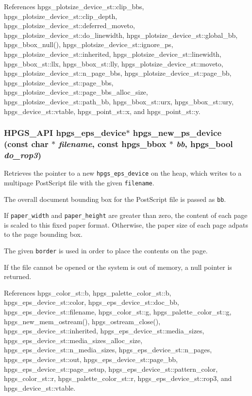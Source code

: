References hpgs\_\-plotsize\_\-device\_\-st::clip\_\-bbs, hpgs\_\-plotsize\_\-device\_\-st::clip\_\-depth, hpgs\_\-plotsize\_\-device\_\-st::deferred\_\-moveto, hpgs\_\-plotsize\_\-device\_\-st::do\_\-linewidth, hpgs\_\-plotsize\_\-device\_\-st::global\_\-bb, hpgs\_\-bbox\_\-null(), hpgs\_\-plotsize\_\-device\_\-st::ignore\_\-ps, hpgs\_\-plotsize\_\-device\_\-st::inherited, hpgs\_\-plotsize\_\-device\_\-st::linewidth, hpgs\_\-bbox\_\-st::llx, hpgs\_\-bbox\_\-st::lly, hpgs\_\-plotsize\_\-device\_\-st::moveto, hpgs\_\-plotsize\_\-device\_\-st::n\_\-page\_\-bbs, hpgs\_\-plotsize\_\-device\_\-st::page\_\-bb, hpgs\_\-plotsize\_\-device\_\-st::page\_\-bbs, hpgs\_\-plotsize\_\-device\_\-st::page\_\-bbs\_\-alloc\_\-size, hpgs\_\-plotsize\_\-device\_\-st::path\_\-bb, hpgs\_\-bbox\_\-st::urx, hpgs\_\-bbox\_\-st::ury, hpgs\_\-device\_\-st::vtable, hpgs\_\-point\_\-st::x, and hpgs\_\-point\_\-st::y.
\subsubsection[hpgs\_\-new\_\-ps\_\-device]{\setlength{\rightskip}{0pt plus 5cm}HPGS\_\-API {\bf hpgs\_\-eps\_\-device}$\ast$ hpgs\_\-new\_\-ps\_\-device (const char $\ast$ {\em filename}, \/  const {\bf hpgs\_\-bbox} $\ast$ {\em bb}, \/  hpgs\_\-bool {\em do\_\-rop3})}\label{group__device_g8fc4def644785c7762e048a26b12e29a}


Retrieves the pointer to a new {\tt hpgs\_\-eps\_\-device} on the heap, which writes to a multipage PostScript file with the given {\tt filename}.

The overall document bounding box for the PostScript file is passed as {\tt bb}.

If {\tt paper\_\-width} and {\tt paper\_\-height} are greater than zero, the content of each page is scaled to this fixed paper format. Otherwise, the paper size of each page adpats to the page bounding box.

The given {\tt border} is used in order to place the contents on the page.

If the file cannot be opened or the system is out of memory, a null pointer is returned. 

References hpgs\_\-color\_\-st::b, hpgs\_\-palette\_\-color\_\-st::b, hpgs\_\-eps\_\-device\_\-st::color, hpgs\_\-eps\_\-device\_\-st::doc\_\-bb, hpgs\_\-eps\_\-device\_\-st::filename, hpgs\_\-color\_\-st::g, hpgs\_\-palette\_\-color\_\-st::g, hpgs\_\-new\_\-mem\_\-ostream(), hpgs\_\-ostream\_\-close(), hpgs\_\-eps\_\-device\_\-st::inherited, hpgs\_\-eps\_\-device\_\-st::media\_\-sizes, hpgs\_\-eps\_\-device\_\-st::media\_\-sizes\_\-alloc\_\-size, hpgs\_\-eps\_\-device\_\-st::n\_\-media\_\-sizes, hpgs\_\-eps\_\-device\_\-st::n\_\-pages, hpgs\_\-eps\_\-device\_\-st::out, hpgs\_\-eps\_\-device\_\-st::page\_\-bb, hpgs\_\-eps\_\-device\_\-st::page\_\-setup, hpgs\_\-eps\_\-device\_\-st::pattern\_\-color, hpgs\_\-color\_\-st::r, hpgs\_\-palette\_\-color\_\-st::r, hpgs\_\-eps\_\-device\_\-st::rop3, and hpgs\_\-device\_\-st::vtable.
